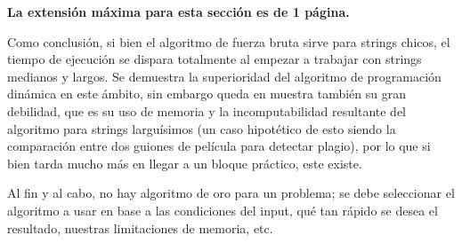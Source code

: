 \begin{mdframed}
    \textbf{La extensión máxima para esta sección es de 1 página.}
\end{mdframed}

Como conclusión, si bien el algoritmo de fuerza bruta sirve para strings chicos, el tiempo de ejecución se dispara totalmente al empezar a trabajar con strings medianos y largos. Se demuestra la superioridad del algoritmo de programación dinámica en este ámbito, sin embargo queda en muestra también su gran debilidad, que es su uso de memoria y la incomputabilidad resultante del algoritmo para strings larguísimos (un caso hipotético de esto siendo la comparación entre dos guiones de película para detectar plagio), por lo que si bien tarda mucho más en llegar a un bloque práctico, este existe.

Al fin y al cabo, no hay algoritmo de oro para un problema; se debe seleccionar el algoritmo a usar en base a las condiciones del input, qué tan rápido se desea el resultado, nuestras limitaciones de memoria, etc.

